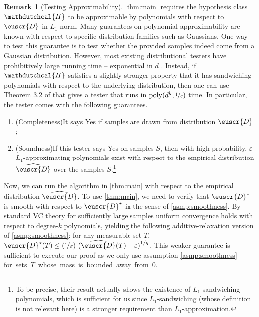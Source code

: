 \documentclass[11pt]{article}
\theoremstyle{plain}
\theoremstyle{definition}
\newtheorem{remark}[theorem]{Remark}
\theoremstyle{remark}
\newcommand{\inparen}[1]{\left(#1\right)}
\newcommand{\nfrac}[2]{\nicefrac{#1}{#2}}
\newcommand{\poly}{\mathrm{poly}}
\newcommand{\eps}{\varepsilon}
\newcommand{\wh}[1]{\widehat{#1}}
\newcommand{\customcal}[1]{\euscr{#1}}
\newcommand{\cD}{\customcal{D}}
\newcommand{\hypo}[1]{\mathdutchcal{#1}}
\newcommand{\hyH}{\hypo{H}}
\newcommand{\cDtrue}{\cD^\star}
\newcommand{\cDgiven}{\cD}
\newcommand{\nL}{L}
\begin{document}
        \begin{remark}[Testing Approximability]
            \label{rem:testing}
            \cref{thm:main} requires the hypothesis class $\hyH$ to be approximable by polynomials with respect to $\cDgiven$ in $\nL_1$-norm.
            Many guarantees on polynomial approximability are known with respect to specific distribution families such as Gaussians.
            One way to test this guarantee is to test whether the provided samples indeed come from a Gaussian distribution.
            However, most existing distributional testers have prohibitively large running time -- exponential in $d$ \cite{rubinfeld2023testing}.
            Instead, if $\hyH$ satisfies a slightly stronger property that it has sandwiching polynomials with respect to the underlying distribution, then one can use Theorem 3.2 of \citet{gollakota2023momentMatching} that gives a tester that runs in $\poly(d^{k},\nfrac{1}{\eps})$ time. %
            In particular, the tester comes with the following guarantees.
            \begin{enumerate}[itemsep=0pt]
                \item {(Completeness)}\quad It says \textsf{Yes} if samples are drawn from distribution $\cDgiven$;
                \item {(Soundness)}\quad If this tester says \textsf{Yes} on samples $S$, then with high probability, $\eps$-$\nL_1$-approximating polynomials exist with respect to the empirical distribution $\wh{\cD}$ over the samples $S$.\footnote{
                    To be precise, their result actually shows the existence of $\nL_1$-sandwiching polynomials, which is sufficient for us since $\nL_1$-sandwiching (whose definition is not relevant here) is a stronger requirement than $\nL_1$-approximation.
                }
            \end{enumerate}
            Now, we can run the algorithm in \cref{thm:main} with respect to the empirical distribution $\wh{\cD}$.
            To use \cref{thm:main}, we need to verify that $\cDtrue$ is smooth with respect to $\cDtrue$ in the sense of \cref{asmp:smoothness}.
            By standard VC theory for sufficiently large samples uniform convergence holds with respect to degree-$k$ polynomials, yielding the following additive-relaxation version of \cref{asmp:smoothness}:
            for any measurable set $T$, $\cDtrue(T)\leq (\nfrac{1}{\sigma}) \, \inparen{\smash{\wh{\cD}}(T)+\eps}^{1/q}$.
            This weaker guarantee is sufficient to execute our proof as we only use assumption \cref{asmp:smoothness} \mbox{for sets $T$ whose mass is bounded away from $0$.}
        \end{remark}
\end{document}
